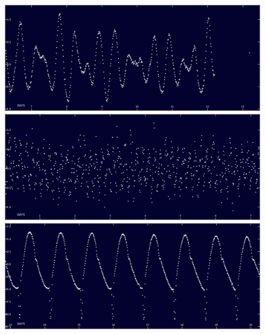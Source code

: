 \documentclass[aspectratio=169]{beamer}
\begin{document}
\begin{frame}
\begin{columns}[c]
\begin{figure}
\includegraphics[height=0.24\textheight]{img/zooniverse.org/starspots_moderate.png}
\includegraphics[height=0.24\textheight]{img/zooniverse.org/startspots_fast.png}
\includegraphics[height=0.24\textheight]{img/zooniverse.org/eclipsing_binaries_another.png}
\captionsetup{labelformat=empty}
\end{figure}
\end{columns}
\end{frame}
\end{document}
